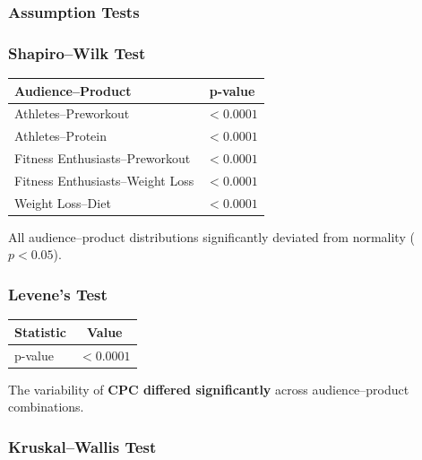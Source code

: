 \subsubsection{Assumption Tests}

\subsubsection{Shapiro--Wilk Test}

\begin{table}[H]
	\centering
	\begin{tabular}{lc}
		\toprule
		Audience--Product & p-value \\
		\midrule
		Athletes--Preworkout & $<0.0001$ \\
		Athletes--Protein & $<0.0001$ \\
		Fitness Enthusiasts--Preworkout & $<0.0001$ \\
		Fitness Enthusiasts--Weight Loss & $<0.0001$ \\
		Weight Loss--Diet & $<0.0001$ \\
		\bottomrule
	\end{tabular}
\end{table}

All audience--product distributions significantly deviated from normality ($p<0.05$).

\vspace{0.3cm}

\subsubsection{Levene's Test}

\begin{table}[H]
	\centering
	\begin{tabular}{lc}
		\toprule
		Statistic & Value \\
		\midrule
		p-value & $<0.0001$ \\
		\bottomrule
	\end{tabular}
\end{table}

The variability of \textbf{CPC differed significantly} across audience--product combinations.

\vspace{0.3cm}

\subsubsection{Kruskal--Wallis Test}

